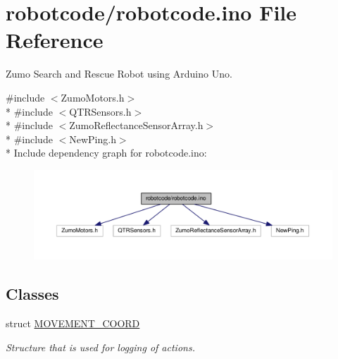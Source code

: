 \hypertarget{robotcode_8ino}{\section{robotcode/robotcode.ino File Reference}
\label{robotcode_8ino}
}


Zumo Search and Rescue Robot using Arduino Uno.  


{\ttfamily \#include $<$Zumo\+Motors.\+h$>$}\\*
{\ttfamily \#include $<$Q\+T\+R\+Sensors.\+h$>$}\\*
{\ttfamily \#include $<$Zumo\+Reflectance\+Sensor\+Array.\+h$>$}\\*
{\ttfamily \#include $<$New\+Ping.\+h$>$}\\*
Include dependency graph for robotcode.\+ino\+:\nopagebreak
\begin{figure}[H]
\begin{center}
\leavevmode
\includegraphics[width=350pt]{robotcode_8ino__incl}
\end{center}
\end{figure}
\subsection*{Classes}
\begin{DoxyCompactItemize}
\item 
struct \hyperlink{structMOVEMENT__COORD}{M\+O\+V\+E\+M\+E\+N\+T\+\_\+\+C\+O\+O\+R\+D}
\begin{DoxyCompactList}\small\item\em Structure that is used for logging of actions. \end{DoxyCompactList}\end{DoxyCompactItemize}
